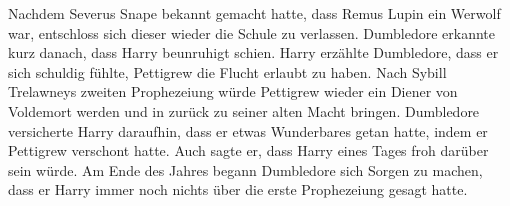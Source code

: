\documentclass[a4paper, 10pt]{article}
\begin{document}
\vspace{10pt}
\newline
{}  
Nachdem Severus Snape bekannt gemacht hatte, dass Remus Lupin ein Werwolf war, entschloss sich dieser wieder die Schule zu verlassen. Dumbledore erkannte kurz danach, dass Harry beunruhigt schien. Harry erzählte Dumbledore, dass er sich schuldig fühlte, Pettigrew die Flucht erlaubt zu haben. Nach Sybill Trelawneys zweiten Prophezeiung würde Pettigrew wieder ein Diener von Voldemort werden und in zurück zu seiner alten Macht bringen. Dumbledore versicherte Harry daraufhin, dass er etwas Wunderbares getan hatte, indem er Pettigrew verschont hatte. Auch sagte er, dass Harry eines Tages froh darüber sein würde.
\vspace{10pt}
\newline
{}  
Am Ende des Jahres begann Dumbledore sich Sorgen zu machen, dass er Harry immer noch nichts über die erste Prophezeiung gesagt hatte.
\end{document}
